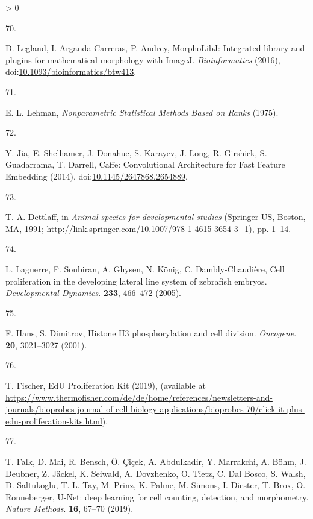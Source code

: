 \documentclass[10pt, b5paper, singlespacinge, twoside]{reedthesis} %
\newlength{\cslhangindent}
\newlength{\csllabelwidth}
\newenvironment{CSLReferences}[3] %
  {%
    \setlength{\parindent}{0pt}
    \ifodd #1 \everypar{\setlength{\hangindent}{\cslhangindent}}\ignorespaces\fi
    \ifnum #2 > 0
    \setlength{\parskip}{#2\baselineskip}
    \fi
  }%
  {}
\newcommand{\CSLLeftMargin}[1]{\parbox[t]{\maxof{\widthof{#1}}{\csllabelwidth}}{#1}}
\newcommand{\CSLRightInline}[1]{\parbox[t]{\linewidth}{#1}}
\theoremstyle{definition}
\theoremstyle{definition}
\theoremstyle{definition}
\theoremstyle{remark}
\begin{document}
\begin{CSLReferences}{0}{0}
\leavevmode\hypertarget{ref-Legland2016}{}%
\CSLLeftMargin{70. }
\CSLRightInline{D. Legland, I. Arganda-Carreras, P. Andrey, {MorphoLibJ: Integrated library and plugins for mathematical morphology with ImageJ}. \emph{Bioinformatics} (2016), doi:\href{https://doi.org/10.1093/bioinformatics/btw413}{10.1093/bioinformatics/btw413}.}

\leavevmode\hypertarget{ref-Lehman}{}%
\CSLLeftMargin{71. }
\CSLRightInline{E. L. Lehman, \emph{{Nonparametric Statistical Methods Based on Ranks}} (1975).}

\leavevmode\hypertarget{ref-Jia2014}{}%
\CSLLeftMargin{72. }
\CSLRightInline{Y. Jia, E. Shelhamer, J. Donahue, S. Karayev, J. Long, R. Girshick, S. Guadarrama, T. Darrell, {Caffe: Convolutional Architecture for Fast Feature Embedding} (2014), doi:\href{https://doi.org/10.1145/2647868.2654889}{10.1145/2647868.2654889}.}

\leavevmode\hypertarget{ref-Dettlaff1991}{}%
\CSLLeftMargin{73. }
\CSLRightInline{T. A. Dettlaff, in \emph{Animal species for developmental studies} (Springer US, Boston, MA, 1991; \url{http://link.springer.com/10.1007/978-1-4615-3654-3_1}), pp. 1--14.}

\leavevmode\hypertarget{ref-Laguerre2005a}{}%
\CSLLeftMargin{74. }
\CSLRightInline{L. Laguerre, F. Soubiran, A. Ghysen, N. König, C. Dambly-Chaudière, {Cell proliferation in the developing lateral line system of zebrafish embryos}. \emph{Developmental Dynamics}. \textbf{233}, 466--472 (2005).}

\leavevmode\hypertarget{ref-Hans2001}{}%
\CSLLeftMargin{75. }
\CSLRightInline{F. Hans, S. Dimitrov, {Histone H3 phosphorylation and cell division}. \emph{Oncogene}. \textbf{20}, 3021--3027 (2001).}

\leavevmode\hypertarget{ref-Fischer}{}%
\CSLLeftMargin{76. }
\CSLRightInline{T. Fischer, {EdU Proliferation Kit} (2019), (available at \url{https://www.thermofisher.com/de/de/home/references/newsletters-and-journals/bioprobes-journal-of-cell-biology-applications/bioprobes-70/click-it-plus-edu-proliferation-kits.html}).}

\leavevmode\hypertarget{ref-Falk2019}{}%
\CSLLeftMargin{77. }
\CSLRightInline{T. Falk, D. Mai, R. Bensch, Ö. Çiçek, A. Abdulkadir, Y. Marrakchi, A. Böhm, J. Deubner, Z. Jäckel, K. Seiwald, A. Dovzhenko, O. Tietz, C. Dal Bosco, S. Walsh, D. Saltukoglu, T. L. Tay, M. Prinz, K. Palme, M. Simons, I. Diester, T. Brox, O. Ronneberger, {U-Net: deep learning for cell counting, detection, and morphometry}. \emph{Nature Methods}. \textbf{16}, 67--70 (2019).}


\end{CSLReferences}
\end{document}

